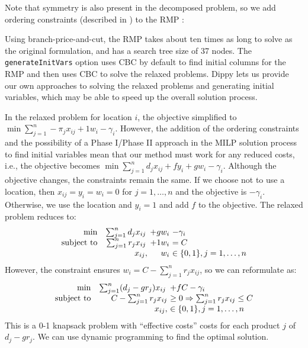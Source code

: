 Note that symmetry is also present in the decomposed problem, so we add ordering constraints (described in ) to the RMP :


\begin{sloppypar}Using branch-price-and-cut, the RMP takes about ten times as long to solve as the original formulation, and has a search tree size of 37 nodes.
The \lstinline{generateInitVars} option uses CBC by default to find initial columns for the RMP and then uses CBC to solve the relaxed problems.
Dippy lets us provide our own approaches to solving the relaxed problems and generating initial variables, which may be able to speed up the overall solution process.\end{sloppypar}

In the relaxed problem for location $i$, the objective simplified to $\min \sum_{j=1}^n -\pi_j x_{ij} +1 w_i - \gamma_i$. 
However, the addition of the ordering constraints and the possibility of a Phase I/Phase II approach in the \ac{MILP} solution process to find initial variables mean that our method must work for any reduced costs, i.e., the objective becomes $\min \sum_{j=1}^n d_j x_{ij} + f y_i + g w_i - \gamma_i$. Although the objective changes, the constraints remain the same. If we choose not to use a location, then $x_{ij} = y_i = w_i = 0$ for $j=1, \ldots, n$ and the objective is $-\gamma_i$. Otherwise, we use the location and $y_i = 1$ and add $f$ to the objective. The relaxed problem reduces to:
\[
\begin{array}{rr@{\ }r@{\ }l}
\min              & \sum_{j=1}^n d_j x_{ij} \, & +g w_i & - \gamma_i \\
\text{subject to} & \sum_{j=1}^n r_j x_{ij} \, & +1 w_i & = C \\
                  &                  x_{ij},   &    w_i    & \in \{0, 1 \}, j = 1, \ldots, n
\end{array}
\]
However, the constraint ensures $w_i = C - \sum_{j=1}^n r_j x_{ij}$, so we can reformulate as:
\[
\begin{array}{rr@{\ }l}
\min              & \sum_{j=1}^n (d_j - g r_j) x_{ij} \, & +f C - \gamma_i \\
\text{subject to} & C - \sum_{j=1}^n r_j x_{ij} & \geq 0 \Rightarrow \sum_{j=1}^n r_j x_{ij} \leq C \\
                  &                  x_{ij},   & \in \{0, 1 \}, j = 1, \ldots, n
\end{array}
\]
This is a 0-1 knapsack problem with ``effective costs'' costs for each product $j$ of $d_j - g r_j$. We can use dynamic programming to find the optimal solution.

